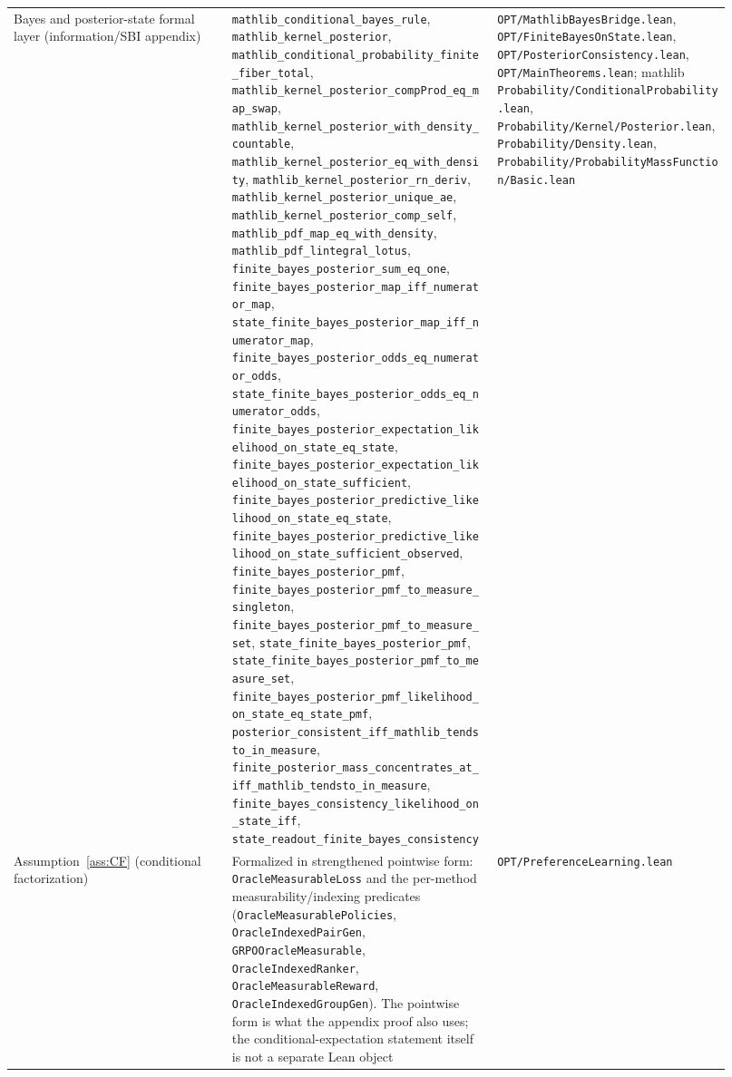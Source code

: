 {\begin{longtable}{p{0.28\linewidth}p{0.34\linewidth}p{0.30\linewidth}}
Bayes and posterior-state formal layer (information/SBI appendix) &
\texttt{mathlib\_conditional\_bayes\_rule}, \texttt{mathlib\_kernel\_posterior},
\nolinkurl{mathlib_conditional_probability_finite_fiber_total},
\nolinkurl{mathlib_kernel_posterior_compProd_eq_map_swap},
\nolinkurl{mathlib_kernel_posterior_with_density_countable},
\nolinkurl{mathlib_kernel_posterior_eq_with_density},
\nolinkurl{mathlib_kernel_posterior_rn_deriv},
\nolinkurl{mathlib_kernel_posterior_unique_ae},
\nolinkurl{mathlib_kernel_posterior_comp_self},
\texttt{mathlib\_pdf\_map\_eq\_with\_density},
\texttt{mathlib\_pdf\_lintegral\_lotus},
\texttt{finite\_bayes\_posterior\_sum\_eq\_one},
\nolinkurl{finite_bayes_posterior_map_iff_numerator_map},
\nolinkurl{state_finite_bayes_posterior_map_iff_numerator_map},
\nolinkurl{finite_bayes_posterior_odds_eq_numerator_odds},
\nolinkurl{state_finite_bayes_posterior_odds_eq_numerator_odds},
\nolinkurl{finite_bayes_posterior_expectation_likelihood_on_state_eq_state},
\nolinkurl{finite_bayes_posterior_expectation_likelihood_on_state_sufficient},
\nolinkurl{finite_bayes_posterior_predictive_likelihood_on_state_eq_state},
\nolinkurl{finite_bayes_posterior_predictive_likelihood_on_state_sufficient_observed},
\texttt{finite\_bayes\_posterior\_pmf},
\nolinkurl{finite_bayes_posterior_pmf_to_measure_singleton},
\nolinkurl{finite_bayes_posterior_pmf_to_measure_set},
\texttt{state\_finite\_bayes\_posterior\_pmf},
\nolinkurl{state_finite_bayes_posterior_pmf_to_measure_set},
\nolinkurl{finite_bayes_posterior_pmf_likelihood_on_state_eq_state_pmf},
\nolinkurl{posterior_consistent_iff_mathlib_tendsto_in_measure},
\nolinkurl{finite_posterior_mass_concentrates_at_iff_mathlib_tendsto_in_measure},
\nolinkurl{finite_bayes_consistency_likelihood_on_state_iff},
\texttt{state\_readout\_finite\_bayes\_consistency} &
\texttt{OPT/MathlibBayesBridge.lean}, \texttt{OPT/FiniteBayesOnState.lean},
\texttt{OPT/PosteriorConsistency.lean}, \texttt{OPT/MainTheorems.lean};
mathlib \texttt{Probability/ConditionalProbability.lean},
\texttt{Probability/Kernel/Posterior.lean},
\texttt{Probability/Density.lean},
\texttt{Probability/ProbabilityMassFunction/Basic.lean} \\

Assumption~\ref{ass:CF} (conditional factorization) &
Formalized in strengthened pointwise form: \texttt{OracleMeasurableLoss} and the
per-method measurability/indexing predicates (\texttt{OracleMeasurablePolicies},
\texttt{OracleIndexedPairGen}, \texttt{GRPOOracleMeasurable},
\texttt{OracleIndexedRanker}, \texttt{OracleMeasurableReward},
\texttt{OracleIndexedGroupGen}). The pointwise form is what the appendix proof
also uses; the conditional-expectation statement itself is not a separate Lean
object &
\texttt{OPT/PreferenceLearning.lean} \\


\end{longtable}}
